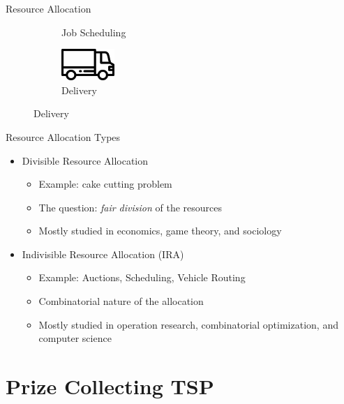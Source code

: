 \begin{frame}[t]{Resource Allocation}
\begin{itemize}
\begin{figure}
\begin{subfigure}[b]{0.45\textwidth}
                \caption*{Job Scheduling}
                \label{fig:my_label}
            \end{subfigure}
            \begin{subfigure}[b]{0.45\textwidth}      
                \centering
                \includegraphics[width=2cm]{delivery-truck.eps}
                \caption*{Delivery}
                \label{fig:my_label}
            \end{subfigure}
        \end{figure}
    \end{itemize}    
\end{frame}

\begin{frame}[t]{Resource Allocation Types}
    \begin{itemize}
        \item<2-> Divisible Resource Allocation
            \begin{itemize}
                \item<3-> Example: cake cutting problem
            	\item<4-> The question: \emph{fair division} of the resources
            	\item<5-> Mostly studied in  economics, game theory, and sociology
            \end{itemize}
        \item<6-> Indivisible Resource Allocation (\alert{IRA})
            \begin{itemize}
                \item<7-> Example: Auctions, Scheduling, Vehicle Routing
                \item<8-> Combinatorial nature of the allocation
                \item<9-> Mostly studied in operation research, combinatorial optimization, and computer science
            \end{itemize}  
    \end{itemize}
\end{frame}

\section{Prize Collecting TSP}
\frame{\textbf{\insertsection}}

